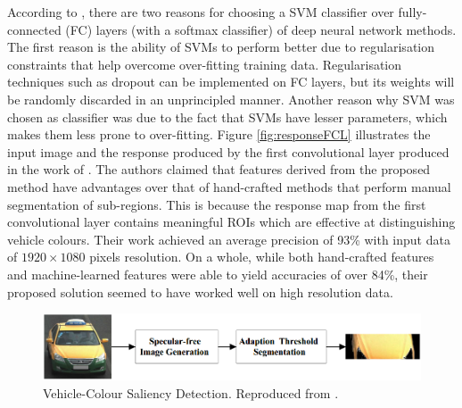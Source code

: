 According to , there are two reasons for choosing a SVM classifier over fully-connected (FC) layers (with a softmax classifier) of deep neural network methods. The first reason is the ability of SVMs to perform
better due to regularisation constraints that help overcome over-fitting training data. Regularisation techniques such as dropout can be implemented on FC layers, but its weights will be randomly discarded in an unprincipled manner. Another reason why SVM was chosen as classifier was due to the fact that SVMs have lesser parameters, which makes them less prone to over-fitting. 
Figure
\ref{fig:responseFCL} illustrates the input image and the response produced by
the first convolutional layer produced in the work of . The authors claimed that features derived from the proposed method have advantages over that of hand-crafted methods that perform manual segmentation of sub-regions. This is because the response map from the first convolutional layer contains meaningful ROIs which are effective at distinguishing vehicle colours. Their work achieved an average precision of 93\% with input data of $1920 \times 1080$ pixels resolution. On a whole, while both hand-crafted features and machine-learned features were able to yield accuracies of over 84\%, their proposed solution seemed to have worked well on high resolution data.

\begin{figure}[hbt!]
 \centering
 \includegraphics[width=1\textwidth]{image/lit/salient1.png}
 \caption[Vehicle-Colour Saliency Detection]{Vehicle-Colour Saliency Detection.
Reproduced from .}
 \label{fig:Colorsaliency}
\end{figure}

